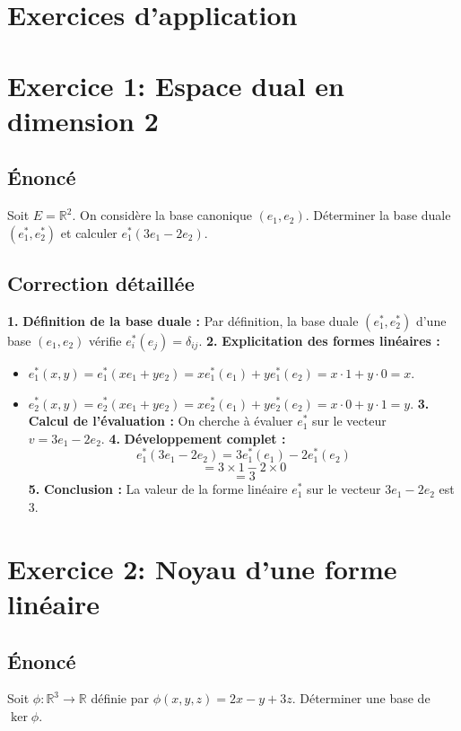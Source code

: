 \documentclass[12pt,a4paper]{report}
\begin{document}
\chapter{Exercices d'application}
\chapter{Exercice 1: Espace dual en dimension 2}
\section{Énoncé}
Soit $E = \mathbb{R}^2$. On considère la base canonique $(e_1, e_2)$. Déterminer la base duale $(e_1^*, e_2^*)$ et calculer $e_1^*(3e_1 - 2e_2)$.

\section{Correction détaillée}
\textbf{1.} \textbf{Définition de la base duale :} Par définition, la base duale $(e_1^*, e_2^*)$ d'une base $(e_1, e_2)$ vérifie $e_i^*(e_j) = \delta_{ij}$.
\textbf{2.} \textbf{Explicitation des formes linéaires :}
\begin{itemize}
\item $e_1^*(x, y) = e_1^*(xe_1 + ye_2) = x e_1^*(e_1) + y e_1^*(e_2) = x \cdot 1 + y \cdot 0 = x$.
\item $e_2^*(x, y) = e_2^*(xe_1 + ye_2) = x e_2^*(e_1) + y e_2^*(e_2) = x \cdot 0 + y \cdot 1 = y$.
\textbf{3.} \textbf{Calcul de l'évaluation :} On cherche à évaluer $e_1^*$ sur le vecteur $v = 3e_1 - 2e_2$.
\textbf{4.} \textbf{Développement complet :}
   $$e_1^*(3e_1 - 2e_2) = 3 e_1^*(e_1) - 2 e_1^*(e_2)$$
   $$= 3 \times 1 - 2 \times 0$$
   $$= 3$$
\textbf{5.} \textbf{Conclusion :} La valeur de la forme linéaire $e_1^*$ sur le vecteur $3e_1 - 2e_2$ est $3$.
\end{itemize}

\newpage
\chapter{Exercice 2: Noyau d'une forme linéaire}
\section{Énoncé}
Soit $\phi : \mathbb{R}^3 \to \mathbb{R}$ définie par $\phi(x, y, z) = 2x - y + 3z$. Déterminer une base de $\ker \phi$.
\end{document}
